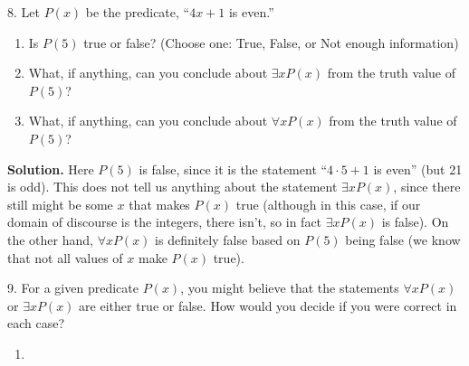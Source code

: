 \documentclass[10pt,]{book}
\theoremstyle{plain}
\theoremstyle{definition}
\theoremstyle{definition}
\numberwithin{equation}{chapter}
\begin{document}
\begin{exerciselist}
\par
\item[8.]\hypertarget{exercise-8}{}\noindent%
\hypertarget{p-248}{}%
Let \(P(x)\) be the predicate, ``\(4x+1\) is even.''%
\par
\hypertarget{p-249}{}%
\leavevmode%
\begin{enumerate}[label=(\alph*)]
\item\hypertarget{li-130}{}\hypertarget{p-250}{}%
Is \(P(5)\) true or false? (Choose one: True, False, or Not enough information)%
\item\hypertarget{li-131}{}\hypertarget{p-251}{}%
What, if anything, can you conclude about \(\exists x P(x)\) from the truth value of \(P(5)\)?%
\par
\hypertarget{p-252}{}%
\par
\begin{itemize}[label=$\odot$,leftmargin=3em,]
\end{itemize}
%
\item\hypertarget{li-132}{}\hypertarget{p-253}{}%
What, if anything, can you conclude about \(\forall x P(x)\) from the truth value of \(P(5)\)?%
\par
\hypertarget{p-254}{}%
\par
\begin{itemize}[label=$\odot$,leftmargin=3em,]
\end{itemize}
%
\end{enumerate}
%
\par
\medskip\noindent%
\textbf{Solution.}\quad \hypertarget{p-255}{}%
Here \(P(5)\) is false, since it is the statement ``\(4\cdot 5 + 1\) is even'' (but 21 is odd).  This does not tell us anything about the statement \(\exists x P(x)\), since there still might be some \(x\) that makes \(P(x)\) true (although in this case, if our domain of discourse is the integers, there isn't, so in fact \(\exists x P(x)\) is false).  On the other hand, \(\forall x P(x)\) is definitely false based on \(P(5)\) being false (we know that not all values of \(x\) make \(P(x)\) true).%
\par
\item[9.]\hypertarget{exercise-9}{}\noindent%
\hypertarget{p-256}{}%
For a given predicate \(P(x)\), you might believe that the statements \(\forall x P(x)\) or \(\exists x P(x)\) are either true or false.  How would you decide if you were correct in each case?%
\par
\hypertarget{p-257}{}%
\leavevmode%
\begin{enumerate}[label=(\alph*)]
\item\hypertarget{li-133}{}\hypertarget{p-258}{}%

\end{enumerate}
\end{exerciselist}
\end{document}
